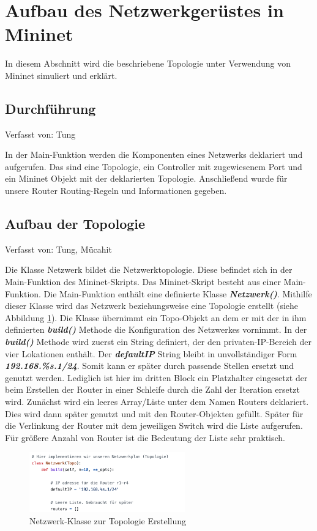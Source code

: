 \documentclass[fontsize=12pt,paper=a4,open=any,parskip=half,
  twoside=false,toc=listof,toc=bibliography,fleqn,leqno,
  captions=nooneline,captions=tableabove,british]{scrbook}
\begin{document}
\section{Aufbau des Netzwerkgerüstes in Mininet}
In diesem Abschnitt wird die beschriebene Topologie unter Verwendung von Mininet simuliert und erklärt.

\subsection{Durchführung}
{\tiny Verfasst von: Tung\par}
In der Main-Funktion werden die Komponenten eines Netzwerks deklariert und aufgerufen. Das sind eine Topologie, ein Controller mit zugewiesenem Port und ein Mininet Objekt mit der deklarierten Topologie. Anschließend wurde für unsere Router Routing-Regeln und Informationen gegeben.

\subsection{Aufbau der Topologie}
{\tiny Verfasst von: Tung, Mücahit\par}
Die Klasse Netzwerk bildet die Netzwerktopologie. Diese befindet sich in der Main-Funktion des Mininet-Skripts. Das Mininet-Skript besteht aus einer Main-Funktion. Die Main-Funktion enthält eine definierte Klasse \textit{\textbf{Netzwerk()}}. Mithilfe dieser Klasse wird das Netzwerk beziehungsweise eine Topologie erstellt (siehe Abbildung \ref{mininet1}). Die Klasse übernimmt ein Topo-Objekt an dem er mit der in ihm definierten \textit{\textbf{build()}} Methode die Konfiguration des Netzwerkes vornimmt. In der \textit{\textbf{build()}} Methode wird zuerst ein String definiert, der den privaten-IP-Bereich der vier Lokationen enthält. Der \textit{\textbf{defaultIP}} String bleibt in unvollständiger Form \textit{\textbf{192.168.\%s.1/24}}. Somit kann er später durch passende Stellen ersetzt und genutzt werden. Lediglich ist hier im dritten Block ein Platzhalter eingesetzt der beim Erstellen der Router in einer Schleife durch die Zahl der Iteration ersetzt wird. Zunächst wird ein leeres Array/Liste unter dem Namen Routers deklariert. Dies wird dann später genutzt und mit den Router-Objekten gefüllt. Später für die Verlinkung der Router mit dem jeweiligen Switch wird die Liste aufgerufen. Für größere Anzahl von Router ist die Bedeutung der Liste sehr praktisch.

\begin{figure}[H]
 \centering
 \includegraphics[width=0.6\textwidth]{Bilder/mininet1}
 \captionsetup{justification=centering,margin=1cm}
 \caption{Netzwerk-Klasse zur Topologie Erstellung}
 \label{mininet1}
\end{figure}
\end{document}
